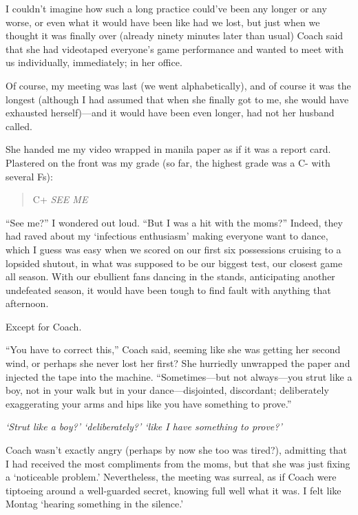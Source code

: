 I couldn't imagine how such a long practice could've been any longer or
any worse, or even what it would have been like had we lost, but just
when we thought it was finally over (already ninety minutes later than
usual) Coach said that she had videotaped everyone's game performance
and wanted to meet with us individually, immediately; in her office.

Of course, my meeting was last (we went alphabetically), and of course
it was the longest (although I had assumed that when she finally got to
me, she would have exhausted herself)---and it would have been even
longer, had not her husband called.

She handed me my video wrapped in manila paper as if it was a report
card. Plastered on the front was my grade (so far, the highest grade was
a C- with several Fs):

\begin{quote}
C+ \emph{SEE ME}
\end{quote}

\noindent ``See me?'' I wondered out loud. ``But I was a hit with the
moms?'' Indeed, they had raved about my `infectious enthusiasm' making
everyone want to dance, which I guess was easy when we scored on our
first six possessions cruising to a lopsided shutout, in what was
supposed to be our biggest test, our closest game all season. With our
ebullient fans dancing in the stands, anticipating another undefeated
season, it would have been tough to find fault with anything that
afternoon.

Except for Coach.

``You have to correct this,'' Coach said, seeming like she was getting
her second wind, or perhaps she never lost her first? She hurriedly
unwrapped the paper and injected the tape into the machine.
``Sometimes---but not always---you strut like a boy, not in your walk
but in your dance---disjointed, discordant; deliberately exaggerating
your arms and hips like you have something to prove.''

\emph{`Strut like a boy?' `deliberately?' `like I have something to
prove?'}

Coach wasn't exactly angry (perhaps by now she too was tired?),
admitting that I had received the most compliments from the moms, but
that she was just fixing a `noticeable problem.' Nevertheless, the
meeting was surreal, as if Coach were tiptoeing around a well-guarded
secret, knowing full well what it was. I felt like Montag `hearing
something in the silence.'

